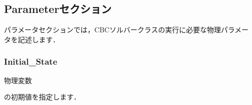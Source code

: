 \pagebreak
\subsection{Parameterセクション}
\label{sec:physical_parameter}

パラメータセクションでは，CBCソルバークラスの実行に必要な物理パラメータを記述します．



\subsubsection{Initial\_State}

\hypertarget{tgt:initial_state}{物理変数}の初期値を指定します．

